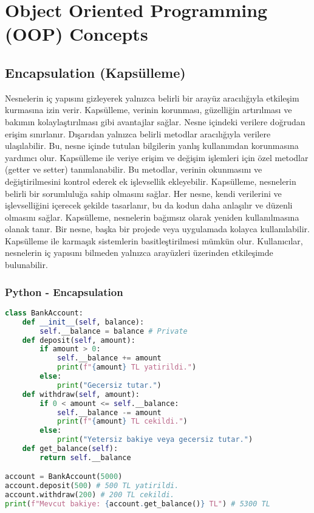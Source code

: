\section{Object Oriented Programming (OOP) Concepts}

\subsection{Encapsulation (Kapsülleme)}

Nesnelerin iç yapısını gizleyerek yalnızca belirli bir arayüz aracılığıyla etkileşim kurmasına izin verir. Kapsülleme, verinin korunması, güzelliğin artırılması ve bakımın kolaylaştırılması gibi avantajlar sağlar. Nesne içindeki verilere doğrudan erişim sınırlanır. Dışarıdan yalnızca belirli metodlar aracılığıyla verilere ulaşılabilir. Bu, nesne içinde tutulan bilgilerin yanlış kullanımdan korunmasına yardımcı olur. Kapsülleme ile veriye erişim ve değişim işlemleri için özel metodlar (getter ve setter) tanımlanabilir. Bu metodlar, verinin okunmasını ve değiştirilmesini kontrol ederek ek işlevsellik ekleyebilir. Kapsülleme, nesnelerin belirli bir sorumluluğa sahip olmasını sağlar. Her nesne, kendi verilerini ve işlevselliğini içerecek şekilde tasarlanır, bu da kodun daha anlaşılır ve düzenli olmasını sağlar. Kapsülleme, nesnelerin bağımsız olarak yeniden kullanılmasına olanak tanır. Bir nesne, başka bir projede veya uygulamada kolayca kullanılabilir. Kapsülleme ile karmaşık sistemlerin basitleştirilmesi mümkün olur. Kullanıcılar, nesnelerin iç yapısını bilmeden yalnızca arayüzleri üzerinden etkileşimde bulunabilir. 

\subsubsection{Python - Encapsulation}

\begin{lstlisting}[language=Python]
class BankAccount:
    def __init__(self, balance):
        self.__balance = balance # Private
    def deposit(self, amount):
        if amount > 0:
            self.__balance += amount
            print(f"{amount} TL yatirildi.")
        else:
            print("Gecersiz tutar.")
    def withdraw(self, amount):
        if 0 < amount <= self.__balance:
            self.__balance -= amount
            print(f"{amount} TL cekildi.")
        else:
            print("Yetersiz bakiye veya gecersiz tutar.")
    def get_balance(self):
        return self.__balance

account = BankAccount(5000)
account.deposit(500) # 500 TL yatirildi.
account.withdraw(200) # 200 TL cekildi.
print(f"Mevcut bakiye: {account.get_balance()} TL") # 5300 TL
\end{lstlisting}

